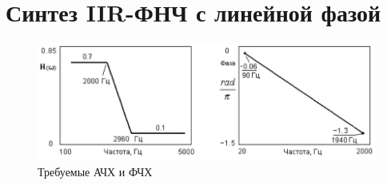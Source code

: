 \section{Синтез IIR-ФНЧ с линейной фазой}
\begin{figure}[H]
  \centering
  \includegraphics[width=\textwidth]{imgs/img5.png}
  \caption{Требуемые АЧХ и ФЧХ}
  \label{fig:}
\end{figure}

